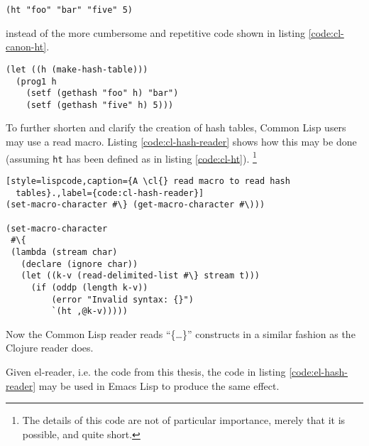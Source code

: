 \documentclass[a4paper,10pt,twoside]{report}
\newcommand{\el}{Emacs Lisp}
\newcommand{\cl}{Common Lisp}
\newcommand{\elr}{el-reader}
\newcommand{\fun}[1]{\texttt{#1}}
\begin{document}

\begin{lstlisting}[style=lispinline]
(ht "foo" "bar" "five" 5)
\end{lstlisting}


instead of the more cumbersome and repetitive code shown in listing
\ref{code:cl-canon-ht}.


\begin{lstlisting}[style=lispcode,caption={Canonical way to create a hash
  table.},label={code:cl-canon-ht}]
(let ((h (make-hash-table)))
  (prog1 h
    (setf (gethash "foo" h) "bar")
    (setf (gethash "five" h) 5)))
\end{lstlisting}

To further shorten and clarify the creation of hash tables, \cl{} users may use
a read macro. Listing \ref{code:cl-hash-reader} shows how this may be done
(assuming \fun{ht} has been defined as in listing \ref{code:cl-ht}).
\footnote{The details of this code are not of particular importance, merely that
  it is possible, and quite short.}

\begin{lstlisting}[style=lispcode,caption={A \cl{} read macro to read hash
  tables}.,label={code:cl-hash-reader}]
(set-macro-character #\} (get-macro-character #\)))

(set-macro-character
 #\{
 (lambda (stream char)
   (declare (ignore char))
   (let ((k-v (read-delimited-list #\} stream t)))
     (if (oddp (length k-v))
         (error "Invalid syntax: {}")
         `(ht ,@k-v)))))
\end{lstlisting}

Now the \cl{} reader reads ``\{\ldots{}\}'' constructs in a similar fashion as
the Clojure reader does.

Given \elr{}, i.e. the code from this thesis, the code in listing
\ref{code:el-hash-reader} may be used in \el{} to produce the same effect.
\end{document}
